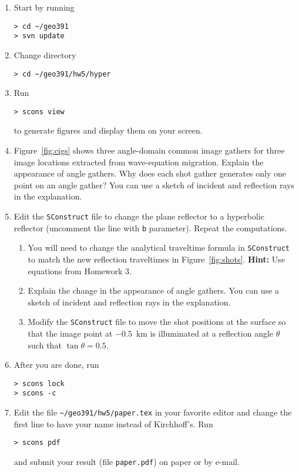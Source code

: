 \begin{enumerate}

\item Start by running
\begin{verbatim}
> cd ~/geo391
> svn update
\end{verbatim}
    
\item Change directory 
\begin{verbatim}
> cd ~/geo391/hw5/hyper
\end{verbatim}
\item Run
\begin{verbatim}
> scons view
\end{verbatim}
to generate figures and display them on your screen.  

\item

Figure~\ref{fig:cigs} shows three angle-domain common image gathers
for three image locations extracted from wave-equation migration.
Explain the appearance of angle gathers.  Why does each shot gather
generates only one point on an angle gather? You can use a sketch of
incident and reflection rays in the explanation.


\item Edit the \texttt{SConstruct} file to change the plane reflector
  to a hyperbolic reflector (uncomment the line with \texttt{b}
  parameter). Repeat the computations.

\begin{enumerate}
\item You will need to change the analytical traveltime formula in
  \texttt{SConstruct} to match the new reflection traveltimes in
  Figure~\ref{fig:shots}.  \textbf{Hint:} Use equations from Homework
  3.
\item Explain the change in the appearance of angle gathers. You can
  use a sketch of incident and reflection rays in the explanation. 
\item Modify the \texttt{SConstruct} file to move the shot positions
  at the surface so that the image point at $-0.5$~km is illuminated at
  a reflection angle $\theta$ such that $\tan{\theta}=0.5$.
\end{enumerate}

\item After you are done, run
\begin{verbatim}
> scons lock 
> scons -c
\end{verbatim}

\item Edit the file
  \verb#~/geo391/hw5/paper.tex# in your favorite editor and change the
first line to have your name instead of Kirchhoff's. Run
\begin{verbatim}
> scons pdf
\end{verbatim}
and submit your result (file \texttt{paper.pdf}) on paper or by
e-mail.

\end{enumerate}

{\tiny

}
